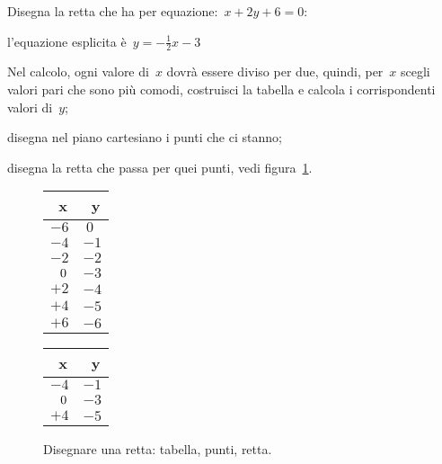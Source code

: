 \begin{esempio}
 Disegna la retta che ha per equazione:~\(x+2y+6=0\):
 \begin{enumeratea}
  \item l'equazione esplicita è~\(y=- \frac{1}{2}x - 3\)
  \item Nel calcolo, ogni valore di~\(x\) dovrà essere diviso per due, 
   quindi, per~\(x\) scegli valori pari che sono più comodi, costruisci la 
   tabella e calcola i corrispondenti valori di~\(y\);
  \item disegna nel piano cartesiano i punti che ci stanno;
  \item disegna la retta che passa per quei punti, 
   vedi figura~\ref{fig:retta02}.
 \end{enumeratea}
\end{esempio}

\begin{inaccessibleblock}
 \begin{figure}[h]
\centering \hspace{-5mm}
 \begin{minipage}[]{.18\textwidth}
  \begin{center}
   \begin{tabular}{l|l}
    ~x  & ~y \\
    \hline
    \(-6\) & \(~0\) \\
    \(-4\) & \(-1\) \\
    \(-2\) & \(-2\) \\
    \(\hspace{2.6mm} 0\) & \(-3\) \\
    \(+2\) & \(-4\) \\
    \(+4\) & \(-5\) \\
    \(+6\) & \(-6\) 
   \end{tabular}
   
   \vspace{5mm}
   \begin{tabular}{l|l}
    ~x  & ~y \\
    \hline
    \(-4\) & \(-1\) \\
    \(\hspace{2.7mm} 0\) & \(-3\) \\
    \(+4\) & \(-5\) 
   \end{tabular}
  \end{center}
 \end{minipage}
 \begin{minipage}[]{.40\textwidth}
  \begin{center} \puntib \end{center}
 \end{minipage}
 \begin{minipage}[]{.40\textwidth}
  \begin{center} \rettab \end{center}
 \end{minipage}
  \caption{Disegnare una retta: tabella, punti, retta.}\label{fig:retta02}
\end{figure}
\end{inaccessibleblock}

